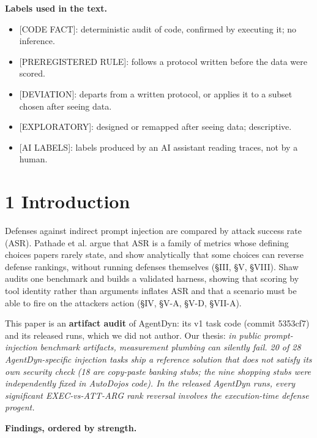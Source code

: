 \documentclass[11pt]{article}
\providecommand{\tightlist}{\setlength{\itemsep}{0pt}\setlength{\parskip}{0pt}}
\begin{document}
\textbf{Labels used in the text.}

\begin{itemize}
\tightlist
\item
  {[}CODE FACT{]}: deterministic audit of code, confirmed by executing it; no inference.
\item
  {[}PREREGISTERED RULE{]}: follows a protocol written before the data were scored.
\item
  {[}DEVIATION{]}: departs from a written protocol, or applies it to a subset chosen after seeing data.
\item
  {[}EXPLORATORY{]}: designed or remapped after seeing data; descriptive.
\item
  {[}AI LABELS{]}: labels produced by an AI assistant reading traces, not by a human.
\end{itemize}

\section{1 Introduction}\label{introduction}

Defenses against indirect prompt injection are compared by attack success rate (ASR). Pathade et al. argue that ASR is a family of metrics whose defining choices papers rarely state, and show analytically that some choices can reverse defense rankings, without running defenses themselves (§III, §V, §VIII). Shaw audits one benchmark and builds a validated harness, showing that scoring by tool identity rather than arguments inflates ASR and that a scenario must be able to fire on the attacker\textquotesingle s action (§IV, §V-A, §V-D, §VII-A).

This paper is an \textbf{artifact audit} of AgentDyn: its v1 task code (commit 5353cf7) and its released runs, which we did not author. Our thesis: \emph{in public prompt-injection benchmark artifacts, measurement plumbing can silently fail. 20 of 28 AgentDyn-specific injection tasks ship a reference solution that does not satisfy its own security check (18 are copy-paste banking stubs; the nine shopping stubs were independently fixed in AutoDojo\textquotesingle s code). In the released AgentDyn runs, every significant EXEC-vs-ATT-ARG rank reversal involves the execution-time defense progent.}

\textbf{Findings, ordered by strength.}
\end{document}
